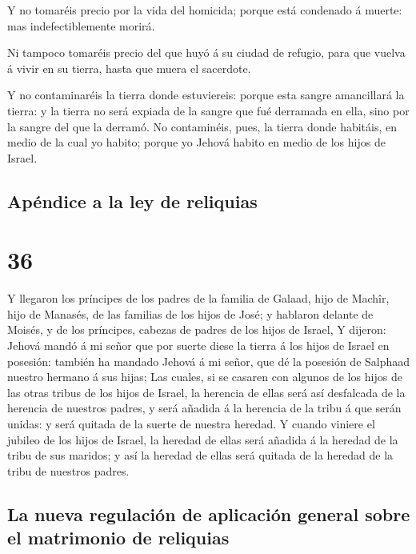  Y no tomaréis precio por la vida del homicida; porque
está condenado á muerte: mas indefectiblemente morirá.

 Ni tampoco tomaréis precio del que huyó á su ciudad de
refugio, para que vuelva á vivir en su tierra, hasta que muera el
sacerdote.

 Y no contaminaréis la tierra donde estuviereis: porque
esta sangre amancillará la tierra: y la tierra no será expiada de la
sangre que fué derramada en ella, sino por la sangre del que la derramó.
 No contaminéis, pues, la tierra donde habitáis, en medio
de la cual yo habito; porque yo Jehová habito en medio de los hijos de
Israel.

\hypertarget{apuxe9ndice-a-la-ley-de-reliquias}{%
\subsection{Apéndice a la ley de
reliquias}\label{apuxe9ndice-a-la-ley-de-reliquias}}

\hypertarget{section-35}{%
\section{36}\label{section-35}}

 Y llegaron los príncipes de los padres de la familia de
Galaad, hijo de Machîr, hijo de Manasés, de las familias de los hijos de
José; y hablaron delante de Moisés, y de los príncipes, cabezas de
padres de los hijos de Israel,  Y dijeron: Jehová mandó á
mi señor que por suerte diese la tierra á los hijos de Israel en
posesión: también ha mandado Jehová á mi señor, que dé la posesión de
Salphaad nuestro hermano á sus hijas;  Las cuales, si se
casaren con algunos de los hijos de las otras tribus de los hijos de
Israel, la herencia de ellas será así desfalcada de la herencia de
nuestros padres, y será añadida á la herencia de la tribu á que serán
unidas: y será quitada de la suerte de nuestra heredad.  Y
cuando viniere el jubileo de los hijos de Israel, la heredad de ellas
será añadida á la heredad de la tribu de sus maridos; y así la heredad
de ellas será quitada de la heredad de la tribu de nuestros padres.

\hypertarget{la-nueva-regulaciuxf3n-de-aplicaciuxf3n-general-sobre-el-matrimonio-de-reliquias}{%
\subsection{La nueva regulación de aplicación general sobre el
matrimonio de
reliquias}\label{la-nueva-regulaciuxf3n-de-aplicaciuxf3n-general-sobre-el-matrimonio-de-reliquias}}

